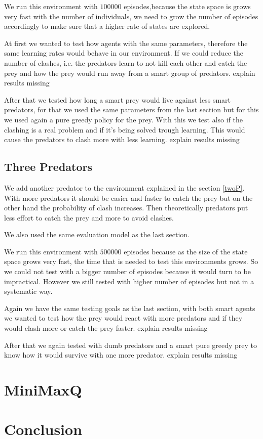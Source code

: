 \documentclass{article}
\begin{document}
We run this environment with $100000$ episodes,because the state space is grows
very fast with the number of individuals, we need to grow the number of episodes
accordingly to make sure that a higher rate of states are explored.

At first we wanted to test how agents with the same parameters, therefore
the same learning rates would behave in our environment. If we could reduce the
number of clashes, i.e. the predators learn to not kill each other and catch the
prey and how the prey would run away from a smart group of predators.
\error explain results missing

After that we tested how long a smart prey would live against less smart
predators, for that we used the same parameters from the last section but for
this we used again a pure greedy policy for the prey.
With this we test also if the clashing is a real problem and if it's being solved
trough learning. This would cause the predators to clash more with less
learning. 
\error explain results missing


\subsection{Three Predators}
We add another predator to the environment explained in the section \ref{twoP}.
With more predators it should be easier and faster to catch the prey but on the
other hand the probability of clash increases. Then theoretically predators put
less effort to catch the prey and more to avoid clashes.

We also used the same evaluation model as the last section.

We run this environment with $500000$ episodes because as the size of the state
space grows very fast, the time that is needed to test this environments grows.
So we could not test with a bigger number of episodes because it would turn to
be impractical. However we still tested with higher number of episodes but not
in a systematic way.

Again we have the same testing goals as the last section, with both smart agents
we wanted to test how the prey would react with more predators and if they would
clash more or catch the prey faster.
\error explain results missing

After that we again tested with dumb predators and a smart pure greedy prey to
know how it would survive with one more predator.
\error explain results missing

\section{MiniMaxQ}

\section{Conclusion}
\end{document}
